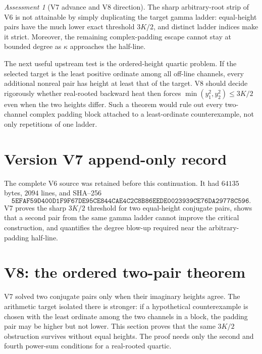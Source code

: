 \documentclass[11pt]{article}
\theoremstyle{definition}
\theoremstyle{remark}
\newtheorem{assessment}[theorem]{Assessment}
\begin{document}
\begin{assessment}[V7 advance and V8 direction]
The sharp arbitrary-root strip of V6 is not attainable by simply duplicating
the target gamma ladder: equal-height pairs have the much lower exact
threshold \(3K/2\), and distinct ladder indices make it strict.  Moreover,
the remaining complex-padding escape cannot stay at bounded degree as
\(\kappa\) approaches the half-line.

The next useful upstream test is the ordered-height quartic problem.  If the
selected target is the least positive ordinate among all off-line channels,
every additional nonreal pair has height at least that of the target.
V8 should decide rigorously whether real-rooted backward heat then forces
\(\min(y_1^2,y_2^2)\le3K/2\) even when the two heights differ.  Such a theorem
would rule out every two-channel complex padding block attached to a
least-ordinate counterexample, not only repetitions of one ladder.
\end{assessment}

\section*{Version V7 append-only record}
The complete V6 source was retained before this continuation.  It had
\(64135\) bytes, \(2094\) lines, and SHA--256
\[
 \texttt{5EFAF59D400D1F9F67DE95CE844CAE4C2C8B86EEDE0023939CE76DA29778C596}.
\]
V7 proves the sharp \(3K/2\) threshold for two equal-height conjugate pairs,
shows that a second pair from the same gamma ladder cannot improve the
critical construction, and quantifies the degree blow-up required near the
arbitrary-padding half-line.




\section{V8: the ordered two-pair theorem}
\label{sec:grh-v8}

V7 solved two conjugate pairs only when their imaginary heights agree.
The arithmetic target isolated there is stronger: if a hypothetical
counterexample is chosen with the least ordinate among the two channels in
a block, the padding pair may be higher but not lower.  This section proves
that the same \(3K/2\) obstruction survives without equal heights.  The
proof needs only the second and fourth power-sum conditions for a
real-rooted quartic.
\end{document}
